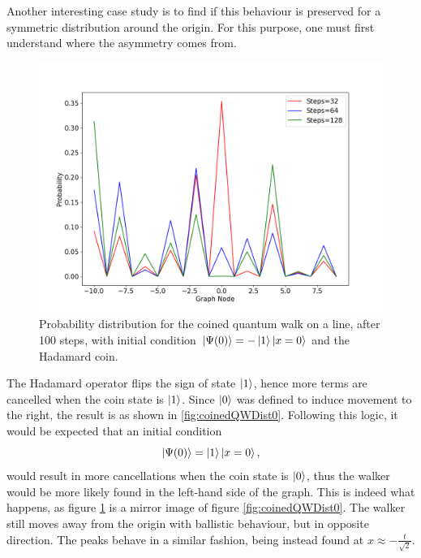 \documentclass[../../dissertation.tex]{subfiles}
\begin{document}
Another interesting case study is to find if this behaviour is preserved for a symmetric distribution around the origin. For this purpose, one must first understand where the asymmetry comes from.
\begin{figure}[!h]
	\centering
	\includegraphics[scale=0.40]{img/CoinedQuantumWalk/CoinedMultiple_psi1_3264128.png}
	\caption{Probability distribution for the coined quantum walk on a line, after 100 steps, with initial condition $\ket{\Psi(0)}=-\ket{1}\ket{x=0}$ and the Hadamard coin.} 
	\label{fig:coinedQWDist1}
\end{figure}
The Hadamard operator flips the sign of state $\ket{1}$, hence more terms are cancelled when the coin state is $\ket{1}$. Since $\ket{0}$ was defined to induce movement to the right, the result is as shown in \ref{fig:coinedQWDist0}. Following this logic, it would be expected that an initial condition 
\begin{equation}
	\ket{\Psi(0)} = \ket{1}\ket{x=0},
	\label{eq:coinedQWInitCond1}
\end{equation}
would result in more cancellations when the coin state is $\ket{0}$, thus the walker would be more likely found in the left-hand side of the graph. This is indeed what happens, as figure \ref{fig:coinedQWDist1} is a mirror image of figure \ref{fig:coinedQWDist0}. The walker still moves away from the origin with ballistic behaviour, but in opposite direction. The peaks behave in a similar fashion, being instead found at $x \approx -\frac{t}{\sqrt{2}}$.\par  
\end{document}
